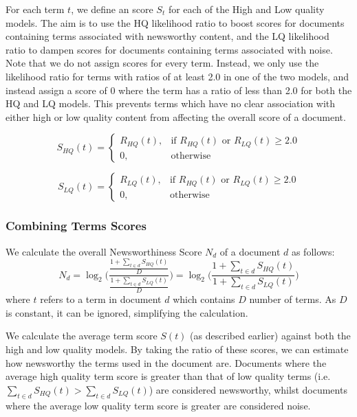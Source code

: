 For each term \(t\), we define an score \(S_t\) for each of the High and Low quality models. The aim is to use the HQ likelihood ratio to boost scores for documents containing terms associated with newsworthy content, and the LQ likelihood ratio to dampen scores for documents containing terms associated with noise.
Note that we do not assign scores for every term.
Instead, we only use the likelihood ratio for terms with ratios of at least 2.0 in one of the two models, and instead assign a score of 0 where the term has a ratio of less than 2.0 for both the HQ and LQ models.
This prevents terms which have no clear association with either high or low quality content from affecting the overall score of a document.

\begin{equation}
	S_{HQ}(t) =
	\begin{cases}
    R_{HQ}(t) ,& \text{if } R_{HQ}(t) \text{ or } R_{LQ}(t) \geq 2.0\\
    0,              & \text{otherwise}
	\end{cases}
\end{equation}

\begin{equation}
	S_{LQ}(t) =
	\begin{cases}
    R_{LQ}(t),& \text{if } R_{HQ}(t) \text{ or } R_{LQ}(t) \geq 2.0\\
    0,              & \text{otherwise}
	\end{cases}
\end{equation}

\subsubsection{Combining Terms Scores}
We calculate the overall Newsworthiness Score \(N_d\) of a document \(d\) as follows:
\begin{equation}
	N_d =
	\log_2\Bigg({\frac{
		\frac{
			1 + \sum_{t \in d}{S_{HQ}(t)}
		}{
			D
		}
	}{
		\frac{
			1 + \sum_{t \in d}{S_{LQ}(t)}
		}{
			D
		}
	}}\Bigg)
	=
	\log_2\bigg({\frac{
		1 + \sum_{t \in d}{S_{HQ}(t)}
	}{
		1 + \sum_{t \in d}{S_{LQ}(t)}
	}}\bigg)
\end{equation}
where \(t\) refers to a term in document \(d\) which contains \(D\) number of terms. As \(D\) is constant, it can be ignored, simplifying the calculation.

We calculate the average term score \(S(t)\) (as described earlier) against both the high and low quality models.
By taking the ratio of these scores, we can estimate how newsworthy the terms used in the document are.
Documents where the average high quality term score is greater than that of low quality terms (i.e. \( \sum_{t \in d}{S_{HQ}(t)} > \sum_{t \in d}{S_{LQ}(t)} \)) are considered newsworthy, whilst documents where the average low quality term score is greater are considered noise.


